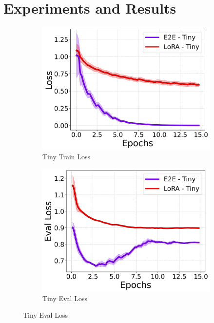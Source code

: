 \documentclass[10pt,twocolumn,letterpaper]{article}
\begin{document}
\section{Experiments and Results}

\begin{figure}[t]
    \centering
    \begin{subfigure}[b]{0.24\textwidth}
        \centering
        \includegraphics[width=\textwidth]{./tiny/loss_line.png}
        \caption{Tiny Train Loss}
    \end{subfigure}
    \begin{subfigure}[b]{0.24\textwidth}
        \centering
        \includegraphics[width=\textwidth]{./tiny/eval_loss_line.png}
        \caption{Tiny Eval Loss}
    \end{subfigure}

\end{figure}
\end{document}

